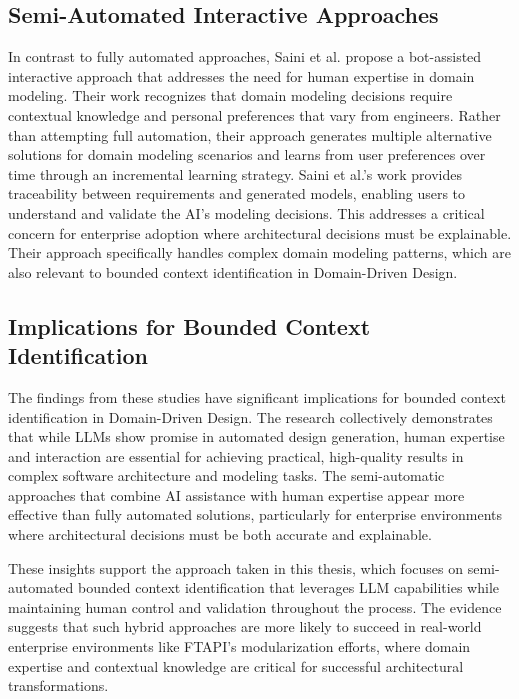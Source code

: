 \subsection{Semi-Automated Interactive Approaches}

In contrast to fully automated approaches, Saini et al. \autocite{Saini2022} propose a bot-assisted interactive approach that addresses the need for human expertise in domain modeling. Their work recognizes that domain modeling decisions require contextual knowledge and personal preferences that vary from engineers. Rather than attempting full automation, their approach generates multiple alternative solutions for domain modeling scenarios and learns from user preferences over time through an incremental learning strategy. Saini et al.'s work provides traceability between requirements and generated models, enabling users to understand and validate the AI's modeling decisions. This addresses a critical concern for enterprise adoption where architectural decisions must be explainable. Their approach specifically handles complex domain modeling patterns, which are also relevant to bounded context identification in Domain-Driven Design.

\subsection{Implications for Bounded Context Identification}

The findings from these studies have significant implications for bounded context identification in Domain-Driven Design. The research collectively demonstrates that while LLMs show promise in automated design generation, human expertise and interaction are essential for achieving practical, high-quality results in complex software architecture and modeling tasks. The semi-automatic approaches that combine AI assistance with human expertise appear more effective than fully automated solutions, particularly for enterprise environments where architectural decisions must be both accurate and explainable.

These insights support the approach taken in this thesis, which focuses on semi-automated bounded context identification that leverages LLM capabilities while maintaining human control and validation throughout the process. The evidence suggests that such hybrid approaches are more likely to succeed in real-world enterprise environments like FTAPI's modularization efforts, where domain expertise and contextual knowledge are critical for successful architectural transformations.

